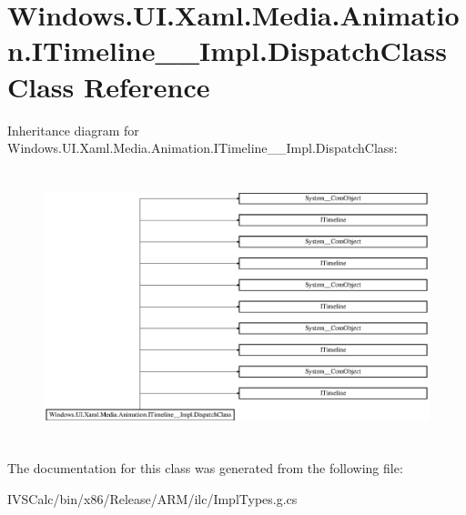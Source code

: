 \hypertarget{class_windows_1_1_u_i_1_1_xaml_1_1_media_1_1_animation_1_1_i_timeline_____impl_1_1_dispatch_class}{}\section{Windows.\+U\+I.\+Xaml.\+Media.\+Animation.\+I\+Timeline\+\_\+\+\_\+\+Impl.\+Dispatch\+Class Class Reference}
\label{class_windows_1_1_u_i_1_1_xaml_1_1_media_1_1_animation_1_1_i_timeline_____impl_1_1_dispatch_class}
Inheritance diagram for Windows.\+U\+I.\+Xaml.\+Media.\+Animation.\+I\+Timeline\+\_\+\+\_\+\+Impl.\+Dispatch\+Class\+:\begin{figure}[H]
\begin{center}
\leavevmode
\includegraphics[height=7.938145cm]{class_windows_1_1_u_i_1_1_xaml_1_1_media_1_1_animation_1_1_i_timeline_____impl_1_1_dispatch_class}
\end{center}
\end{figure}


The documentation for this class was generated from the following file\+:\begin{DoxyCompactItemize}
\item 
I\+V\+S\+Calc/bin/x86/\+Release/\+A\+R\+M/ilc/Impl\+Types.\+g.\+cs\end{DoxyCompactItemize}
